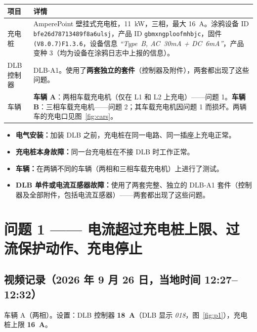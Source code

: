 \documentclass[11pt,a4paper]{article}
\begin{document}
\begin{longtable}{>{\raggedright\arraybackslash}p{3.2cm}>{\raggedright\arraybackslash}p{12.9cm}}
\toprule
\rowcolor{aphead}\textbf{项目} & \textbf{详情} \\
\midrule\endhead
\bottomrule\endfoot
充电桩 & AmperePoint 壁挂式充电桩，11~kW，三相，最大 16~A。涂鸦设备 ID \texttt{bfe26d78713489f8a6ulsj}，产品 ID \texttt{gbmxngploofmhbjc}，固件 \texttt{(V8.0.7)F1.3.6}，设备信息 \emph{“Type~B, AC~30mA + DC~6mA”}，产品变种 3（均为设备在涂鸦日志中上报的信息）。 \\
DLB 控制器 & DLB-A1。使用了\textbf{两套独立的套件}（控制器及附件），两套都出现了这些问题。 \\
车辆 & \textbf{车辆 A}：两相车载充电机（仅在 L1 和 L2 上充电）——问题 1。\textbf{车辆 B}：三相车载充电机——问题 2；其车载充电机因问题 1 而损坏。两辆车的充电口见图~\ref{fig:cars}。 \\
\end{longtable}

\begin{apbox}[已排除的因素]
\begin{itemize}
\item \textbf{电气安装：}加装 DLB 之前，充电桩在同一电路、同一插座上充电正常。
\item \textbf{充电桩本身故障：}同一台充电桩在不接 DLB 时工作正常。
\item \textbf{车辆：}在两辆不同的车辆（两相和三相车载充电机）上进行了测试。
\item \textbf{DLB 单件或电流互感器故障：}使用了两套完整、独立的 DLB-A1 套件（控制器及全部附件，包括电流互感器）——两套都出现了这些问题。
\end{itemize}
\end{apbox}

\section{问题 1 —— 电流超过充电桩上限、过流保护动作、充电停止}

\subsection{视频记录（2026 年 9 月 26 日，当地时间 12:27–12:32）}

车辆 A（两相）。设置：DLB 控制器 \textbf{18~A}（DLB 显示 \emph{018}，图~\ref{fig:p1}），充电桩上限 \textbf{16~A}。
\end{document}
